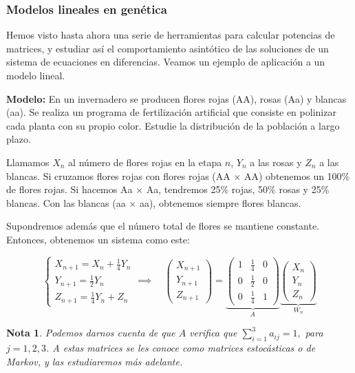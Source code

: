 \documentclass[11pt, a4paper]{article}
\newif\IfInSansMode
\numberwithin{equation}{section}
\theoremstyle{theorem-style}
\theoremstyle{definition-style}
\theoremstyle{remark-style}
\newtheorem*{nota}{Nota}
\theoremstyle{example-style}
\begin{document}
\subsubsection{Modelos lineales en genética}

Hemos visto hasta ahora una serie de herramientas para calcular potencias de matrices, y estudiar así el comportamiento asintótico de las soluciones de un sistema de ecuaciones en diferencias. Veamos un ejemplo de aplicación a un modelo lineal.

\textbf{Modelo:} En un invernadero se producen flores rojas (AA), rosas (Aa) y blancas (aa). Se
realiza un programa de fertilización artificial que consiste en polinizar cada
planta con su propio color. Estudie la distribución de la población a largo
plazo.

Llamamos $X_n$ al número de flores rojas en la etapa $n$, $Y_n$ a las rosas y $Z_n$ a
las blancas. Si cruzamos flores rojas con flores rojas (AA $\times$ AA) obtenemos
un 100\% de flores rojas. Si hacemos Aa $\times$ Aa, tendremos 25\% rojas, 50\% rosas y
25\% blancas. Con las blancas (aa $\times$ aa), obtenemos siempre flores blancas.

Supondremos además que el número total de flores se mantiene constante. Entonces, obtenemos un sistema como este:

$$
\begin{cases}
  X_{n+1} = X_n + \frac{1}{4}Y_n \\
  Y_{n+1} = \frac{1}{2}Y_n \\
  Z_{n+1} = \frac{1}{4}Y_n + Z_n
\end{cases} \implies \quad \begin{pmatrix}
  X_{n+1} \\
  Y_{n+1} \\
  Z_{n+1}
\end{pmatrix} =
\underbrace{\begin{pmatrix}
  1 & \frac{1}{4} & 0 \\
  0 & \frac{1}{2} & 0 \\
  0 & \frac{1}{4} & 1
\end{pmatrix}}_A
\underbrace{\begin{pmatrix}
  X_n \\
  Y_n \\
  Z_n
\end{pmatrix}}_{W_n}$$

\begin{nota}
	Podemos darnos cuenta de que $A$ verifica que $\sum_{i=1}^3 a_{ij} = 1,$ para $j=1,2,3$. A estas matrices se les conoce como \textit{matrices estocásticas} o \textit{de Markov}, y las estudiaremos más adelante.
\end{nota}
\end{document}
